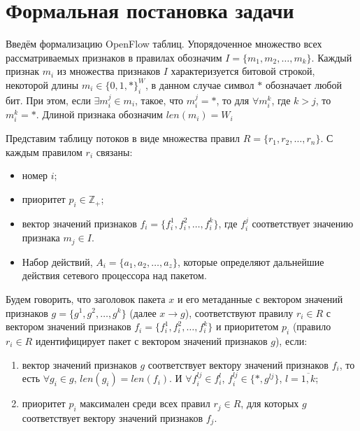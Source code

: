 \documentclass[a4paper, 12pt, titlepage, finall]{extreport}
\begin{document}
    \section{Формальная постановка задачи}
        \label{sect:problem}
        Введём формализацию OpenFlow таблиц.
        Упорядоченное множество всех рассматриваемых признаков в правилах обозначим \(I=\{m_1,m_2,\ldots,m_k\}\). 
        Каждый признак \(m_i\) из множества признаков \(I\) характеризуется битовой строкой, некоторой длины \(m_i \in \{0, 1, *\}^W_i\),
        в данном случае символ \(*\) обозначает любой бит. При этом, если \(\exists m_i^j \in m_i\), такое, что 
        \( m_i^j = *\), то для \( \forall m_i^k \), где \(k > j\), то \( m_i^k = *\). Длиной признака обозначим \(len(m_i) = W_i\)

        Представим таблицу потоков в виде множества правил \(R=\{r_1,r_2,\ldots,r_n\}\). С каждым правилом \(r_i\) связаны:
        \begin{itemize}
            \item номер \(i\);
            \item приоритет \(p_i\in \mathbb{Z}_+\);
            \item вектор значений признаков \(f_i=\{f_i^1,f_i^2,\ldots,f_i^k\}\), где \(f_i^j\) соответствует значению признака \(m_j\in I\). %
            \item Набор действий, \(A_i = \{a_1, a_2, \ldots, a_z\} \), которые определяют дальнейшие действия сетевого процессора над пакетом.
        \end{itemize}

        Будем говорить, что заголовок пакета \(x\) и его метаданные с вектором значений признаков \(g=\{g^1,g^2,\ldots,g^k\}\) (далее \(x \rightarrow g\)),
        соответствуют правилу \(r_i\in R\) с вектором значений признаков \(f_i=\{f_i^1,f_i^2,\ldots,f_i^k\}\) 
        и приоритетом \(p_i\) (правило \(r_i\in R\) идентифицирует пакет с вектором значений признаков \(g\)), если:

        \begin{enumerate}
            \item вектор значений признаков \(g\) соответствует вектору значений признаков \(f_i\), 
                то есть \(\forall g_i \in g\), \(len(g_i) = len(f_i)\). И \(\forall f_i^{lj} \in f_i^l\), \(f_i^{lj} \in \{*, g^{lj}\}\), \(l=\overline{1,k}\);
            \item приоритет \(p_i\) максимален среди всех правил \(r_j\in R\), для которых \(g\) соответствует вектору значений признаков \(f_j\).
        \end{enumerate}
\end{document}
